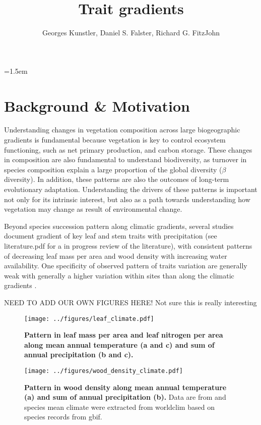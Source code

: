 \documentclass[a4paper,11pt]{article}
\title{Trait gradients}
\author{ Georges Kunstler, Daniel S. Falster, Richard G. FitzJohn}
\date{}
\affiliation{Department of Biological Sciences, Macquarie University,
  Sydney, Australia}
\begin{document}
\mstitleshort
\parindent=1.5em
\addtolength{\parskip}{.3em}


\section{Background \& Motivation}

Understanding changes in vegetation composition across large biogeographic gradients is fundamental because vegetation is key to control ecosystem functioning, such as net primary production, and carbon storage. These changes in composition are also fundamental to understand biodiversity, as turnover in species composition explain a large proportion of the global diversity ($\beta$ diversity). In addition, these patterns are also the outcomes of long-term evolutionary adaptation. Understanding the drivers of these patterns is important not only for its intrinsic interest, but also as a path towards understanding how vegetation may change as result of environmental change.

Beyond species succession pattern along climatic gradients, several studies document gradient of key leaf and stem traits with precipitation (see literature.pdf for a in progress review of the literature), with consistent patterns of decreasing leaf mass per area \citep{Wright-2004,Onoda-2011,Moles-2014} and wood density \citep{Chave-2006} with increasing water availability.  One specificity of observed pattern of traits variation are generally weak with generally a higher variation within sites than along the climatic gradients \citep[see][]{Wright-2004}.

\clearpage

NEED TO ADD OUR OWN FIGURES HERE! Not sure this is really interesting

\begin{figure}[ht]
\centering
\texttt{[image: ../figures/leaf\_climate.pdf]}
\caption{\textbf{Pattern in leaf mass per area and leaf nitrogen per area along mean annual temperature (a and c) and sum of annual precipitation (b and c).}%
\label{fig:leafpattern}}
\end{figure}

\begin{figure}[ht]
\centering
\texttt{[image: ../figures/wood\_density\_climate.pdf]}
\caption{\textbf{Pattern in wood density along mean annual temperature (a) and sum of annual precipitation (b).}
Data are from \citep{CHave-2009} and species mean climate were extracted from worldclim based on species records from gbif.
\label{fig:WDpattern}}
\end{figure}
\end{document}
